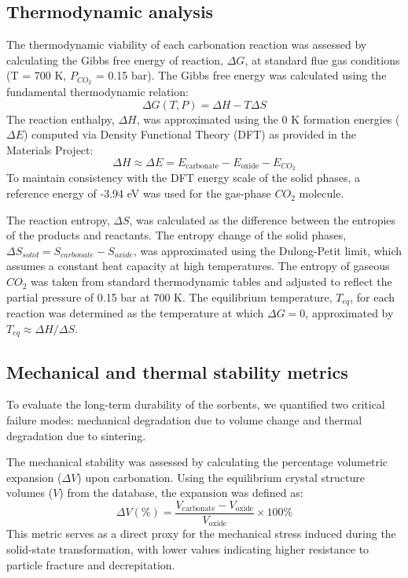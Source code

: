 \documentclass[]{article}
\begin{document}
\subsection{Thermodynamic analysis}
The thermodynamic viability of each carbonation reaction was assessed by calculating the Gibbs free energy of reaction, $\Delta G$, at standard flue gas conditions (T = 700 K, $P_{CO_2}$ = 0.15 bar). The Gibbs free energy was calculated using the fundamental thermodynamic relation:
\begin{equation}
    \Delta G(T, P) = \Delta H - T\Delta S
\end{equation}
The reaction enthalpy, $\Delta H$, was approximated using the 0 K formation energies ($\Delta E$) computed via Density Functional Theory (DFT) as provided in the Materials Project:
\begin{equation}
    \Delta H \approx \Delta E = E_{\text{carbonate}} - E_{\text{oxide}} - E_{CO_2}
\end{equation}
To maintain consistency with the DFT energy scale of the solid phases, a reference energy of -3.94 eV was used for the gas-phase $CO_2$ molecule.

The reaction entropy, $\Delta S$, was calculated as the difference between the entropies of the products and reactants. The entropy change of the solid phases, $\Delta S_{solid} = S_{carbonate} - S_{oxide}$, was approximated using the Dulong-Petit limit, which assumes a constant heat capacity at high temperatures. The entropy of gaseous $CO_2$ was taken from standard thermodynamic tables and adjusted to reflect the partial pressure of 0.15 bar at 700 K. The equilibrium temperature, $T_{eq}$, for each reaction was determined as the temperature at which $\Delta G = 0$, approximated by $T_{eq} \approx \Delta H / \Delta S$.

\subsection{Mechanical and thermal stability metrics}
To evaluate the long-term durability of the sorbents, we quantified two critical failure modes: mechanical degradation due to volume change and thermal degradation due to sintering.

The mechanical stability was assessed by calculating the percentage volumetric expansion ($\Delta V$) upon carbonation. Using the equilibrium crystal structure volumes ($V$) from the database, the expansion was defined as:
\begin{equation}
    \Delta V (\%) = \frac{V_{\text{carbonate}} - V_{\text{oxide}}}{V_{\text{oxide}}} \times 100\%
\end{equation}
This metric serves as a direct proxy for the mechanical stress induced during the solid-state transformation, with lower values indicating higher resistance to particle fracture and decrepitation.
\end{document}
